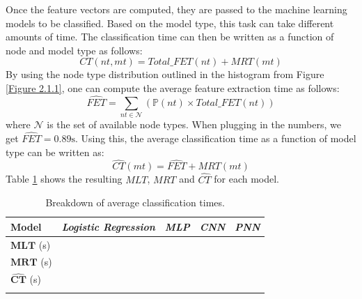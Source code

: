			Once the feature vectors are computed, they are passed to the machine learning models to be classified. Based on the model type, this task can take different amounts of time. The classification time can then be written as a function of node and model type as follows: 
			\begin{equation}
				CT(nt, mt) = Total\_FET(nt) + MRT(mt)
			\end{equation}
			By using the node type distribution outlined in the histogram from Figure \ref{Figure 2.1.1}, one can compute the average feature extraction time as follows:
			\begin{equation}
				\hat{FET} = \sum_{nt\in \mathbf{\mathcal{N}}} (\mathbb{P}(nt) \times Total\_FET(nt))
			\end{equation} 
			where $\mathcal{N}$ is the set of available node types. When plugging in the numbers, we get $\hat{FET} = 0.89\text{s}$. Using this, the average classification time as a function of model type can be written as: 
			\begin{equation}
				\hat{CT}(mt) =  \hat{FET} + MRT(mt) 
			\end{equation}  
			 Table \ref{Table: eval/service-time/classification/CT} shows the resulting $MLT$, $MRT$  and $\hat{CT}$ for each model.
			
			\begin{longtable}{|p{.15\textwidth}||p{}|p{}|p{}|p{}|}
				\textbf{Model} & \textit{Logistic Regression} & \textit{MLP} & \textit{CNN} & \textit{PNN} \\
				\hline
				$\mathbf{MLT}$ (s) & & & &  \\
				\hline
				$\mathbf{MRT}$ (s) & & & & \\
				\hline
				$\mathbf{\hat{CT}}$ (s) & & & &  \\
				\hline
				\caption{Breakdown of average classification times.}
				\label{Table: eval/service-time/classification/CT}
			\end{longtable} 
			
